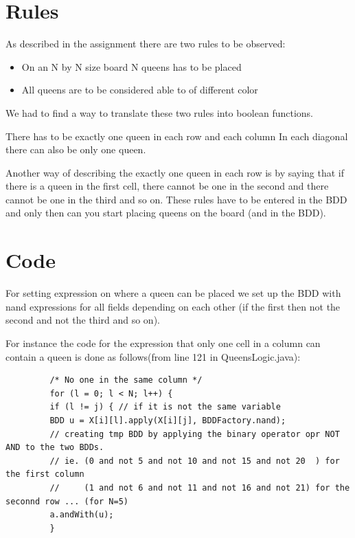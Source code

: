 \section{Rules}

As described in the assignment there are two rules to be observed:
\begin{itemize}
	\item On an N by N size board N queens has to be placed
	\item All queens are to be considered able to of different color
\end{itemize}

We had to find a way to translate these two rules into boolean functions.

There has to be exactly one queen in each row and each column
In each diagonal there can also be only one queen.

Another way of describing the exactly one queen in each row is by saying that if there is a queen in the first cell, there cannot be one in the second and there cannot be one in the third and so on.
These rules have to be entered in the BDD and only then can you start placing queens on the board (and in the BDD).

\section{Code}


For setting expression on where a queen can be placed we set up the BDD with nand expressions for all fields depending on each other (if the first then not the second and not the third and so on).



For instance the code for the expression that only one cell in a column can contain a queen is done as follows(from line 121 in QueensLogic.java):

\begin{lstlisting}
         /* No one in the same column */
         for (l = 0; l < N; l++) {
         if (l != j) { // if it is not the same variable
         BDD u = X[i][l].apply(X[i][j], BDDFactory.nand); 
         // creating tmp BDD by applying the binary operator opr NOT AND to the two BDDs.
         // ie. (0 and not 5 and not 10 and not 15 and not 20  ) for the first column
         //     (1 and not 6 and not 11 and not 16 and not 21) for the seconnd row ... (for N=5)
         a.andWith(u);
         }
\end{lstlisting}

